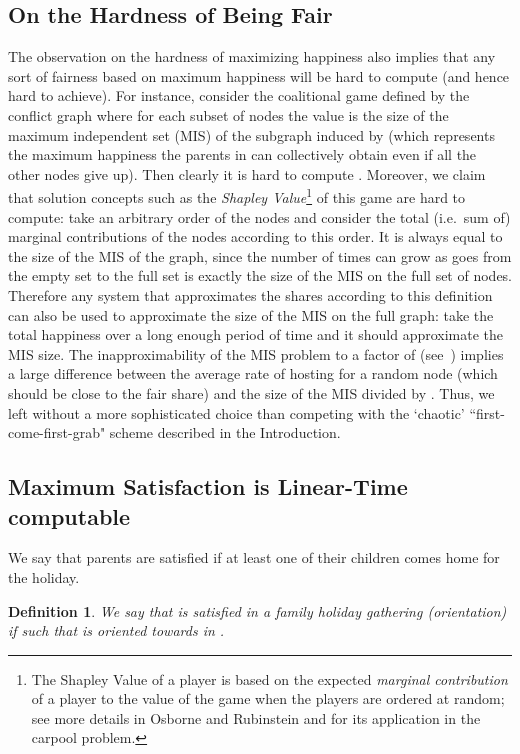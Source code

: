 \documentclass[11pt]{article}
\newtheorem{definition}{Definition}[section]
\begin{document}
\subsection{On the Hardness of Being Fair}
\label{sec:hard_fair}
The observation on the hardness of maximizing happiness also implies that any sort of fairness based on maximum happiness will be hard to compute (and hence hard to achieve).
For instance, consider the coalitional game defined by the conflict graph  where for each subset  of nodes the value  is the size of the maximum independent set (MIS) of the subgraph induced by  (which represents the maximum happiness the parents in  can collectively obtain even if all the other nodes give up). Then clearly it is hard to compute . Moreover,  we claim that solution concepts such as the {\em Shapley Value}\footnote{The Shapley Value of a player is based on the expected {\em marginal contribution} of a player to the value of the game when the players are ordered at random; see more details in Osborne and Rubinstein \cite{OsborneR94} and \cite{Naor2005} for its application in the carpool problem.} of this game are hard to compute: take an arbitrary order of the nodes and consider the total (i.e.\ sum of) marginal contributions of the nodes according to this order. It is always equal to the size of the MIS of the graph, since the number of times  can grow as  goes from the empty set to the full set is exactly the size of the MIS on the full set of nodes. Therefore any system that approximates the shares according to this definition can also be used to approximate the size of the MIS on the full graph: take the total happiness over a long enough period of time and it should approximate the MIS size. The inapproximability of the MIS problem to a factor of  (see~\cite{Hastad99}) implies a large difference between the average rate of hosting for a  random node (which should be close to the fair share) and the size of the MIS divided by .  Thus, we left without a more sophisticated choice than competing with the `chaotic' ``first-come-first-grab" scheme described in the Introduction.

\subsection{Maximum Satisfaction is Linear-Time computable}\label{ss:sat}
We say that parents are satisfied if at least one of their  children
comes home for the holiday.
\begin{definition}
We say that   is {\em satisfied in a family holiday
 gathering} (orientation)  if  such that  is oriented towards  in .
\end{definition}
\end{document}
